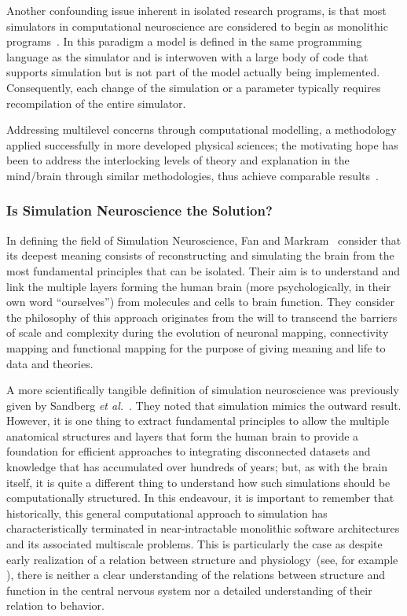\documentclass[10pt,letterpaper]{article}
\begin{document}
Another confounding issue inherent in isolated research programs, is that most simulators in computational neuroscience are considered to begin as monolithic programs~\cite{cannon07:_inter}. In this paradigm a model is defined in the same programming language as the simulator and is interwoven with a large body of code that supports simulation but is not part of the model actually being implemented. Consequently, each change of the simulation or a parameter typically requires recompilation of the entire simulator.

Addressing multilevel concerns through computational modelling, a methodology applied successfully in more developed physical sciences; the motivating hope has been to address the interlocking levels of theory and explanation in the mind/brain through similar methodologies, thus achieve comparable results~\cite{bickle19}.

\subsubsection*{Is Simulation Neuroscience the Solution?}
\label{subsection:simneuro}

In defining the field of Simulation Neuroscience, Fan and Markram~\cite{fan19} consider that its deepest meaning consists of reconstructing and simulating the brain from the most fundamental principles that can be isolated. Their aim is to understand and link the multiple layers forming the human brain (more psychologically, in their own word ``ourselves'') from molecules and cells to brain function. They consider the philosophy of this approach originates from the will to transcend the barriers of scale and complexity during the evolution of neuronal mapping, connectivity mapping and functional mapping for the purpose of giving meaning and life to data and theories.

A more scientifically tangible definition of simulation neuroscience was previously given by Sandberg {\it{et al}.}~\cite{sandberg08}. They noted that simulation mimics the outward result. However, it is one thing to extract fundamental principles to allow the multiple anatomical structures and layers that form the human brain to provide a foundation for efficient approaches to integrating disconnected datasets and knowledge that has accumulated over hundreds of years; but, as with the brain itself, it is quite a different thing to understand how such simulations should be computationally structured. In this endeavour, it is important to remember that historically, this general computational approach to simulation has characteristically terminated in near-intractable monolithic software architectures and its associated multiscale problems.
This is particularly the case as despite early realization of a relation between structure and physiology~(see, for example \cite{sieck17}), there is neither a clear understanding of the relations between structure and function in the central nervous system nor a detailed understanding of their relation to behavior.
\end{document}
